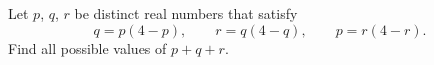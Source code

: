 Let $p$, $q$, $r$ be distinct real numbers that satisfy
\[
q=p(4-p),\qquad r=q(4-q),\qquad p=r(4-r).
\]
Find all possible values of $p+q+r$.
